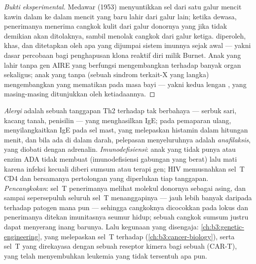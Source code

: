 \begin{proof}[Bukti eksperimental]
Medawar (1953) menyuntikkan sel dari satu galur mencit kawin dalam ke dalam
mencit yang baru lahir dari galur lain; ketika dewasa, penerimanya menerima
cangkok kulit dari galur donornya yang jika tidak demikian akan ditolaknya,
sambil menolak cangkok dari galur ketiga.  diperoleh, khas,
dan ditetapkan oleh apa yang dijumpai sistem imunnya sejak awal --- yakni dasar
percobaan bagi penghapusan klona reaktif diri milik Burnet. Anak yang lahir
tanpa gen AIRE yang berfungsi mengembangkan  terhadap banyak organ
sekaligus; anak yang tanpa  (sebuah sindrom terkait-X yang langka)
mengembangkan  yang mematikan pada masa bayi --- yakni kedua lengan
, yang masing-masing ditunjukkan oleh ketiadaannya.
\end{proof}

\begin{example}\label{ex:b3:adaptive-immunity:failures}
\emph{Alergi} adalah sebuah tanggapan Th2 terhadap  tak berbahaya ---
serbuk sari, kacang tanah, penisilin --- yang menghasilkan IgE; pada pemaparan
ulang,  menyilangkaitkan IgE pada sel mast, yang melepaskan histamin
dalam hitungan menit, dan bila  ada di dalam darah, pelepasan
menyeluruhnya adalah \emph{anafilaksis}, yang diobati dengan adrenalin.
\emph{Imunodefisiensi}: anak yang tidak punya  atau enzim ADA tidak membuat
 (imunodefisiensi gabungan yang berat) lalu mati karena infeksi kecuali
diberi sumsum atau terapi gen; HIV memusnahkan sel~T CD4 dan bersamanya
pertolongan yang diperlukan tiap tanggapan. \emph{Pencangkokan}: sel~T
penerimanya melihat molekul  donornya sebagai asing, dan sampai sepersepuluh
seluruh sel~T menanggapinya --- jauh lebih banyak daripada terhadap patogen mana
pun --- sehingga cangkoknya dicocokkan pada lokus  dan penerimanya ditekan
imunitasnya seumur hidup; sebuah cangkok sumsum justru dapat menyerang inang
barunya. Lalu kegunaan yang disengaja: 
\cref{ch:b3:genetic-engineering},  yang melepaskan
sel~T terhadap  (\cref{ch:b3:cancer-biology}), serta sel~T yang direkayasa
dengan sebuah reseptor kimera bagi sebuah   (CAR-T), yang telah
menyembuhkan leukemia yang tidak tersentuh apa pun.
\end{example}

